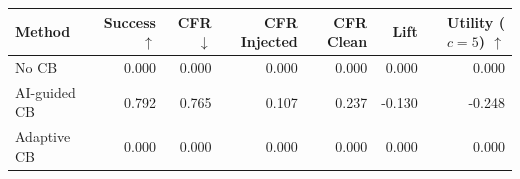 \begin{tabular}{lrrrrrr}
\toprule
Method & Success $\uparrow$ & CFR $\downarrow$ & CFR Injected & CFR Clean & Lift & Utility ($c=5$) $\uparrow$ \\
\midrule
No CB & 0.000 & 0.000 & 0.000 & 0.000 & 0.000 & 0.000 \\
AI-guided CB & 0.792 & 0.765 & 0.107 & 0.237 & -0.130 & -0.248 \\
Adaptive CB & 0.000 & 0.000 & 0.000 & 0.000 & 0.000 & 0.000 \\
\bottomrule
\end{tabular}
